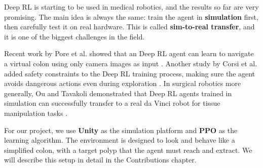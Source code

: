 Deep RL is starting to be used in medical robotics, and the results so far are very promising. The main idea is always the same: train the agent in \textbf{simulation} first, then carefully test it on real hardware. This is called \textbf{sim-to-real transfer}, and it is one of the biggest challenges in the field.

Recent work by Pore et al. showed that an Deep RL agent can learn to navigate a virtual colon using only camera images as input \cite{pore2022iros}. Another study by Corsi et al. added safety constraints to the Deep RL training process, making sure the agent avoids dangerous actions even during exploration \cite{corsi2023arxiv}. In surgical robotics more generally, Ou and Tavakoli demonstrated that Deep RL agents trained in simulation can successfully transfer to a real da Vinci robot for tissue manipulation tasks \cite{ou2023lra}.

For our project, we use \textbf{Unity} as the simulation platform \cite{juliani2018unity} and \textbf{PPO} as the learning algorithm. The environment is designed to look and behave like a simplified colon, with a target polyp that the agent must reach and extract. We will describe this setup in detail in the Contributions chapter.
